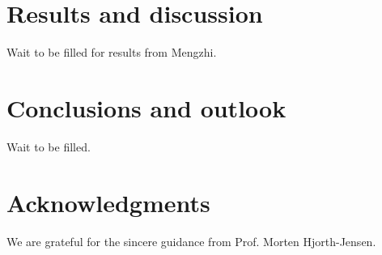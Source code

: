 \documentclass{article}
\begin{document}
	\section{Results and discussion}\label{results}
	Wait to be filled for results from Mengzhi. 
	
	\section{Conclusions and outlook}\label{conclude}
	Wait to be filled. 
	
	\section*{Acknowledgments}
	We are grateful for the sincere guidance from Prof. Morten Hjorth-Jensen. 
	
	\nocite{*} 
	
	
\end{document}
